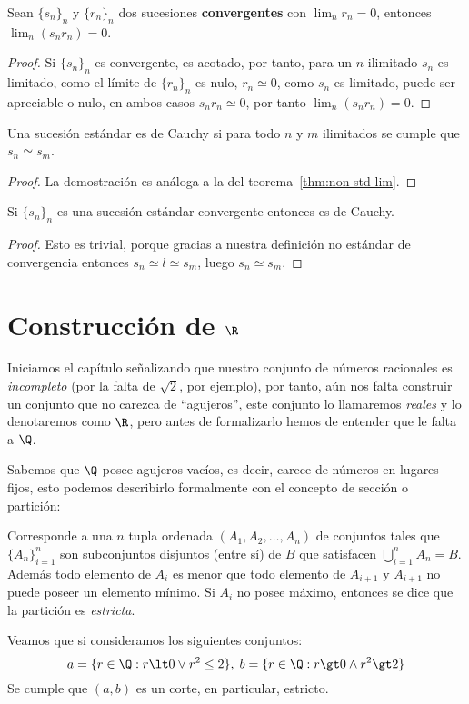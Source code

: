 \documentclass[11pt,oneside,a4paper]{book}
\begin{document}
\begin{thm}
Sean $\{s_n\}_n$ y $\{r_n\}_n$ dos sucesiones \textbf{convergentes} con $\lim_n r_n=0$, entonces $\lim_n (s_nr_n)=0$.
\end{thm}
\begin{proof}
Si $\{s_n\}_n$ es convergente, es acotado, por tanto, para un $n$ ilimitado $s_n$ es limitado, como el límite de $\{r_n\}_n$ es nulo, $r_n\simeq 0$, como $s_n$ es limitado, puede ser apreciable o nulo, en ambos casos $s_nr_n\simeq 0$, por tanto $\lim_n(s_nr_n)=0$.
\end{proof}
\begin{thm}
Una sucesión estándar es de Cauchy si para todo $n$ y $m$ ilimitados se cumple que $s_n\simeq s_m$.
\end{thm}
\begin{proof}
La demostración es análoga a la del teorema~\ref{thm:non-std-lim}.
\end{proof}
\begin{thm}
Si $\{s_n\}_n$ es una sucesión estándar convergente entonces es de Cauchy.
\end{thm}
\begin{proof}
Esto es trivial, porque gracias a nuestra definición no estándar de convergencia entonces $s_n\simeq l\simeq s_m$, luego $s_n\simeq s_m$.
\end{proof}

\section{Construcción de $\R$}
Iniciamos el capítulo señalizando que nuestro conjunto de números racionales es \textit{incompleto} (por la falta de $\sqrt{2}$, por ejemplo), por tanto, aún nos falta construir un conjunto que no carezca de ``agujeros'', este conjunto lo llamaremos \textit{reales} y lo denotaremos como $\R$, pero antes de formalizarlo hemos de entender que le falta a $\Q$.

Sabemos que $\Q$ posee agujeros vacíos, es decir, carece de números en lugares fijos, esto podemos describirlo formalmente con el concepto de sección o partición:
\begin{mydef}
Corresponde a una $n$ tupla ordenada $(A_1,A_2,\dots,A_n)$ de conjuntos tales que $\{A_n\}_{i=1}^n$ son subconjuntos disjuntos (entre sí) de $B$ que satisfacen $\bigcup_{i=1}^n A_n=B$. Además todo elemento de $A_i$ es menor que todo elemento de $A_{i+1}$ y $A_{i+1}$ no puede poseer un elemento mínimo. Si $A_i$ no posee máximo, entonces se dice que la partición es \textit{estricta}.
\end{mydef}
Veamos que si consideramos los siguientes conjuntos:
$$a=\{r\in\Q:r\lt 0\vee r^2\leq 2\},\; b=\{r\in\Q:r\gt 0\wedge r^2\gt 2\}$$
Se cumple que $(a,b)$ es un corte, en particular, estricto.
\end{document}
